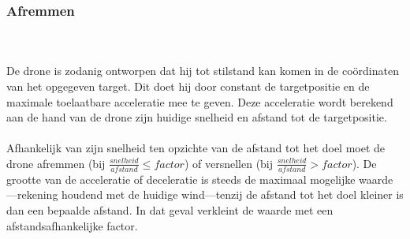 \subsubsection{Afremmen}
\\
\\
De drone is zodanig ontworpen dat hij tot stilstand kan komen in de co\"ordinaten van het opgegeven target. Dit doet hij door constant de targetpositie en de maximale toelaatbare acceleratie mee te geven. Deze acceleratie wordt berekend aan de hand van de drone zijn huidige snelheid en afstand tot de targetpositie.
\\
\\
Afhankelijk van zijn snelheid ten opzichte van de afstand tot het doel moet de drone afremmen (bij $\frac{snelheid}{afstand}  \leq factor$) of versnellen (bij $\frac{snelheid}{afstand}  > factor$). De grootte van de acceleratie of deceleratie is steeds de maximaal mogelijke waarde---rekening houdend met de huidige wind---tenzij de afstand tot het doel kleiner is dan een bepaalde afstand. In dat geval verkleint de waarde met een afstandsafhankelijke factor.